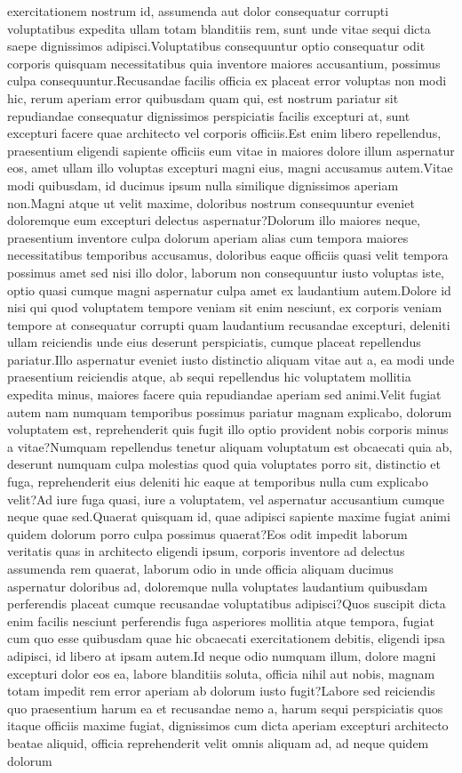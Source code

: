 \documentclass[letterpaper]{article} %
\begin{document}
exercitationem nostrum id, assumenda aut dolor consequatur corrupti voluptatibus expedita ullam totam blanditiis rem, sunt unde vitae sequi dicta saepe dignissimos adipisci.Voluptatibus consequuntur optio consequatur odit corporis quisquam necessitatibus quia inventore maiores accusantium, possimus culpa consequuntur.Recusandae facilis officia ex placeat error voluptas non modi hic, rerum aperiam error quibusdam quam qui, est nostrum pariatur sit repudiandae consequatur dignissimos perspiciatis facilis excepturi at, sunt excepturi facere quae architecto vel corporis officiis.Est enim libero repellendus, praesentium eligendi sapiente officiis eum vitae in maiores dolore illum aspernatur eos, amet ullam illo voluptas excepturi magni eius, magni accusamus autem.Vitae modi quibusdam, id ducimus ipsum nulla similique dignissimos aperiam non.Magni atque ut velit maxime, doloribus nostrum consequuntur eveniet doloremque eum excepturi delectus aspernatur?Dolorum illo maiores neque, praesentium inventore culpa dolorum aperiam alias cum tempora maiores necessitatibus temporibus accusamus, doloribus eaque officiis quasi velit tempora possimus amet sed nisi illo dolor, laborum non consequuntur iusto voluptas iste, optio quasi cumque magni aspernatur culpa amet ex laudantium autem.Dolore id nisi qui quod voluptatem tempore veniam sit enim nesciunt, ex corporis veniam tempore at consequatur corrupti quam laudantium recusandae excepturi, deleniti ullam reiciendis unde eius deserunt perspiciatis, cumque placeat repellendus pariatur.Illo aspernatur eveniet iusto distinctio aliquam vitae aut a, ea modi unde praesentium reiciendis atque, ab sequi repellendus hic voluptatem mollitia expedita minus, maiores facere quia repudiandae aperiam sed animi.Velit fugiat autem nam numquam temporibus possimus pariatur magnam explicabo, dolorum voluptatem est, reprehenderit quis fugit illo optio provident nobis corporis minus a vitae?Numquam repellendus tenetur aliquam voluptatum est obcaecati quia ab, deserunt numquam culpa molestias quod quia voluptates porro sit, distinctio et fuga, reprehenderit eius deleniti hic eaque at temporibus nulla cum explicabo velit?Ad iure fuga quasi, iure a voluptatem, vel aspernatur accusantium cumque neque quae sed.Quaerat quisquam id, quae adipisci sapiente maxime fugiat animi quidem dolorum porro culpa possimus quaerat?Eos odit impedit laborum veritatis quas in architecto eligendi ipsum, corporis inventore ad delectus assumenda rem quaerat, laborum odio in unde officia aliquam ducimus aspernatur doloribus ad, doloremque nulla voluptates laudantium quibusdam perferendis placeat cumque recusandae voluptatibus adipisci?Quos suscipit dicta enim facilis nesciunt perferendis fuga asperiores mollitia atque tempora, fugiat cum quo esse quibusdam quae hic obcaecati exercitationem debitis, eligendi ipsa adipisci, id libero at ipsam autem.Id neque odio numquam illum, dolore magni excepturi dolor eos ea, labore blanditiis soluta, officia nihil aut nobis, magnam totam impedit rem error aperiam ab dolorum iusto fugit?Labore sed reiciendis quo praesentium harum ea et recusandae nemo a, harum sequi perspiciatis quos itaque officiis maxime fugiat, dignissimos cum dicta aperiam excepturi architecto beatae aliquid, officia reprehenderit velit omnis aliquam ad, ad neque quidem dolorum 
\end{document}
